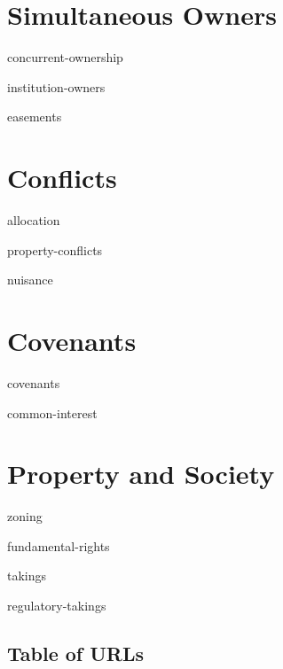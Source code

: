 \documentclass[12pt]{book}
\begin{document}
\edmaterialfalse

\makevolume

\tableofcontents

\mainmatter


\part{Simultaneous Owners}

\module concurrent-ownership

\module institution-owners

\module easements



\part{Conflicts}

\module allocation

\module property-conflicts

\module nuisance




\part{Covenants}

\module covenants

\module common-interest





\part{Property and Society}

\module zoning

\module fundamental-rights

\module takings

\module regulatory-takings


\backmatter

\chapter{Table of URLs}

\begingroup
\footnotesize

\TableOfUrls

\endgroup
\end{document}
